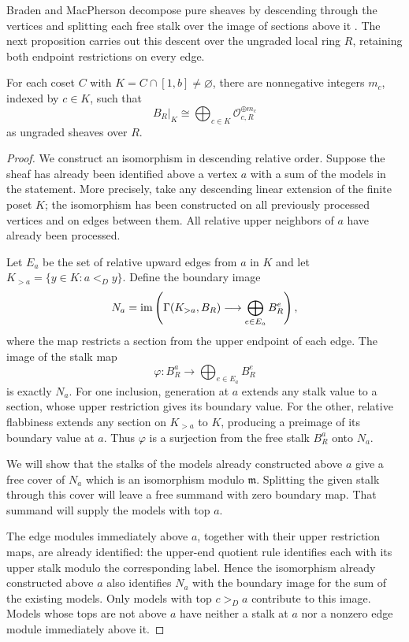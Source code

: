 Braden and MacPherson decompose pure sheaves by descending through the
vertices and splitting each free stalk over the image of sections above it
\cite[Theorem~1.4]{BM01}.  The next proposition carries out this descent
over the ungraded local ring $R$, retaining both endpoint restrictions on
every edge.

\begin{proposition}
\label{loc:decomposition}
For each coset $C$ with $K=C\cap[1,b]\ne\varnothing$, there are
nonnegative integers $m_c$, indexed by $c\in K$, such that
\[
 B_R|_K\cong
 \bigoplus_{c\in K}\mathcal O_{c,R}^{\oplus m_c}
\]
as ungraded sheaves over $R$.
\end{proposition}

\begin{proof}
We construct an isomorphism in descending relative order.  Suppose the
sheaf has already been identified above a vertex $a$ with a sum of the
models in the statement.  More precisely, take any descending linear
extension of the finite poset $K$; the isomorphism has been constructed
on all previously processed vertices and on edges between them.
All relative upper neighbors of $a$ have already been processed.

Let $E_a$ be the set of relative upward edges from $a$ in $K$ and let
$K_{>a}=\{y\in K:a<_D y\}$.  Define the boundary image
\[
 N_a=\operatorname{im}\left(
    \Gamma(K_{>a},B_R)
       \longrightarrow\bigoplus_{e\in E_a}B_R^e
             \right),
\]
where the map restricts a section from the upper endpoint of each edge.
The image of the stalk map
\[
 \varphi:B_R^a\longrightarrow\bigoplus_{e\in E_a}B_R^e
\]
is exactly $N_a$.
For one inclusion, generation at $a$ extends any stalk value to a
section, whose upper restriction gives its boundary value.
For the other, relative flabbiness extends any section on $K_{>a}$ to
$K$, producing a preimage of its boundary value at $a$.
Thus $\varphi$ is a surjection from the free stalk $B_R^a$ onto $N_a$.

We will show that the stalks of the models already constructed above $a$
give a free cover of $N_a$ which is an isomorphism modulo $\mathfrak m$.
Splitting the given stalk through this cover will leave a free summand
with zero boundary map.  That summand will supply the models with top $a$.

The edge modules immediately above $a$, together with their upper
restriction maps, are already identified: the upper-end quotient rule
identifies each with its upper stalk modulo the corresponding label.
Hence the isomorphism already constructed above $a$ also identifies
$N_a$ with the boundary image for the sum of the existing models.
Only models with top $c>_D a$ contribute to this image.  Models whose
tops are not above $a$ have neither a stalk at $a$ nor a nonzero edge
module immediately above it.


\end{proof}

